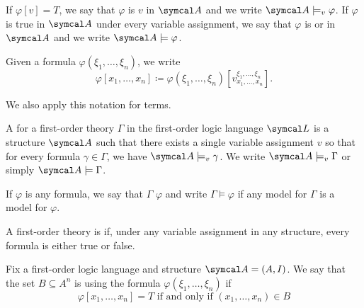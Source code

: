 \begin{definition}
  If \( \varphi[v] = T \), we say that \( \varphi \) is  \( v \) in \( \Cal{A} \) and we write \( \Cal{A} \models_v \varphi \). If \( \varphi \) is true in \( \Cal{A} \) under every variable assignment, we say that \( \varphi \) is  or  in \( \Cal{A} \) and we write \( \Cal{A} \models \varphi \).

  Given a formula \( \varphi(\xi_1, \ldots, \xi_n) \), we write
  \begin{equation*}
    \varphi[x_1, \ldots, x_n] \coloneqq \varphi(\xi_1, \ldots, \xi_n)[v_{x_1, \ldots, x_n}^{\xi_1, \ldots, \xi_n}].
  \end{equation*}

  We also apply this notation for terms.
\end{definition}

\begin{definition}\label{def:first_order_model}\cite[14.35]{OpenLogic20201202}
  A  for a first-order theory \( \Gamma \) in the first-order logic language \( \Cal{L} \) is a structure \( \Cal{A} \) such that there exists a single variable assignment \( v \) so that for every formula \( \gamma \in \Gamma \), we have \( \Cal{A} \models_v \gamma \). We write \( \Cal{A} \models_v \Gamma \) or simply \( \Cal{A} \models \Gamma \).

  If \( \varphi \) is any formula, we say that \( \Gamma \)  \( \varphi \) and write \( \Gamma \models \varphi \) if any model for \( \Gamma \) is a model for \( \varphi \).
\end{definition}

\begin{definition}\label{def:first_order_consistency}
  A first-order theory is  if, under any variable assignment in any structure, every formula is either true or false.
\end{definition}

\begin{definition}\label{def:first_order_definability}
  Fix a first-order logic language and structure \( \Cal{A} = (A, I) \). We say that the set \( B \subseteq A^n \) is  using the formula \( \varphi(\xi_1, \ldots, \xi_n) \) if
  \begin{equation*}
    \varphi[x_1, \ldots, x_n] = T \text{ if and only if } (x_1, \ldots, x_n) \in B
  \end{equation*}
\end{definition}

